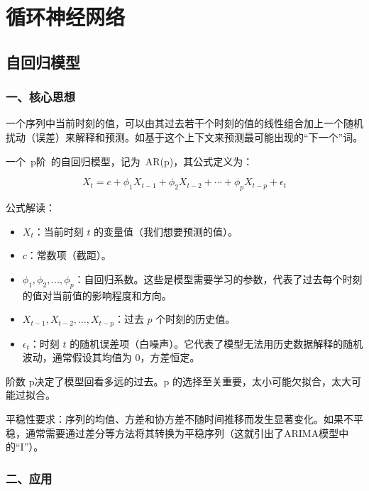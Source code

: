 \hypertarget{ux5faaux73afux795eux7ecfux7f51ux7edc}{%
\chapter{循环神经网络}\label{ux5faaux73afux795eux7ecfux7f51ux7edc}}

\hypertarget{ux81eaux56deux5f52ux6a21ux578b}{%
\section{自回归模型}\label{ux81eaux56deux5f52ux6a21ux578b}}

\hypertarget{ux4e00ux6838ux5fc3ux601dux60f3}{%
\subsection{一、核心思想}\label{ux4e00ux6838ux5fc3ux601dux60f3}}

一个序列中当前时刻的值，可以由其过去若干个时刻的值的线性组合加上一个随机扰动（误差）来解释和预测。如基于这个上下文来预测最可能出现的``下一个''词。

一个~p阶~的自回归模型，记为~AR(p)，其公式定义为：

\[
X_t = c + \phi_1 X_{t-1} + \phi_2 X_{t-2} + \cdots + \phi_p X_{t-p} + \epsilon_t
\]

公式解读：

\begin{itemize}
\tightlist
\item
  \(X_t\)：当前时刻 \(t\) 的变量值（我们想要预测的值）。
\item
  \(c\)：常数项（截距）。
\item
  \(\phi_1, \phi_2, \ldots, \phi_p\)：自回归系数。这些是模型需要学习的参数，代表了过去每个时刻的值对当前值的影响程度和方向。
\item
  \(X_{t-1}, X_{t-2}, \ldots, X_{t-p}\)：过去 \(p\) 个时刻的历史值。
\item
  \(\epsilon_t\)：时刻 \(t\) 的随机误差项（白噪声）。它代表了模型无法用历史数据解释的随机波动，通常假设其均值为 0，方差恒定。
\end{itemize}

阶数 p决定了模型回看多远的过去。p 的选择至关重要，太小可能欠拟合，太大可能过拟合。

平稳性要求：序列的均值、方差和协方差不随时间推移而发生显著变化。如果不平稳，通常需要通过差分等方法将其转换为平稳序列（这就引出了ARIMA模型中的``I''）。

\hypertarget{ux4e8cux5e94ux7528}{%
\subsection{二、应用}\label{ux4e8cux5e94ux7528}}

